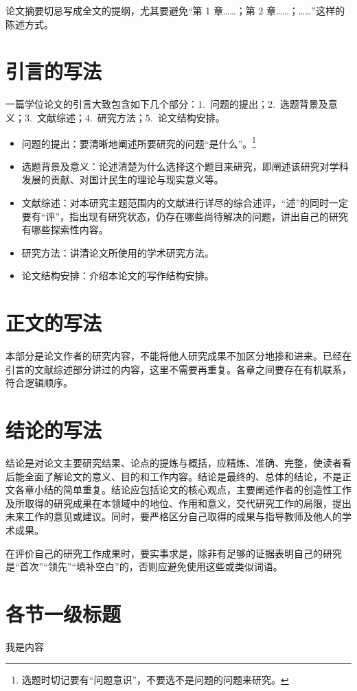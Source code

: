 论文摘要切忌写成全文的提纲，尤其要避免“第 1 章……；第 2 章……；……”这样的陈述方式。

\section{引言的写法}
一篇学位论文的引言大致包含如下几个部分：1.~问题的提出；2.~选题背景及意义；3.~文献综述；4.~研究方法；5.~论文结构安排。
\begin{itemize}
    \item 问题的提出：要清晰地阐述所要研究的问题“是什么”。\footnote{选题时切记要有“问题意识”，不要选不是问题的问题来研究。}
    \item 选题背景及意义：论述清楚为什么选择这个题目来研究，即阐述该研究对学科发展的贡献、对国计民生的理论与现实意义等。
    \item 文献综述：对本研究主题范围内的文献进行详尽的综合述评，“述”的同时一定要有“评”，指出现有研究状态，仍存在哪些尚待解决的问题，讲出自己的研究有哪些探索性内容。
    \item 研究方法：讲清论文所使用的学术研究方法。
    \item 论文结构安排：介绍本论文的写作结构安排。
\end{itemize}

\section{正文的写法}
本部分是论文作者的研究内容，不能将他人研究成果不加区分地掺和进来。已经在引言的文献综述部分讲过的内容，这里不需要再重复。各章之间要存在有机联系，符合逻辑顺序。

\section{结论的写法}
结论是对论文主要研究结果、论点的提炼与概括，应精炼、准确、完整，使读者看后能全面了解论文的意义、目的和工作内容。结论是最终的、总体的结论，不是正文各章小结的简单重复。结论应包括论文的核心观点，主要阐述作者的创造性工作及所取得的研究成果在本领域中的地位、作用和意义，交代研究工作的局限，提出未来工作的意见或建议。同时，要严格区分自己取得的成果与指导教师及他人的学术成果。

在评价自己的研究工作成果时，要实事求是，除非有足够的证据表明自己的研究是“首次”“领先”“填补空白”的，否则应避免使用这些或类似词语。

\section{各节一级标题}
我是内容

